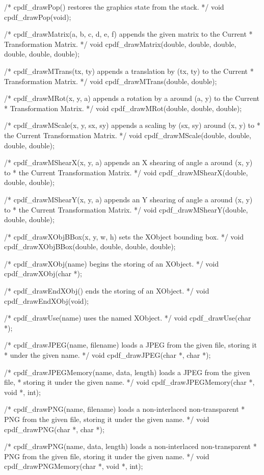 /* cpdf_drawPop() restores the graphics state from the stack. */
void cpdf_drawPop(void);

/* cpdf_drawMatrix(a, b, c, d, e, f) appends the given matrix to the Current
 * Transformation Matrix. */
void cpdf_drawMatrix(double, double, double, double, double, double);

/* cpdf_drawMTrans(tx, ty) appends a translation by (tx, ty) to the Current
 * Transformation Matrix. */
void cpdf_drawMTrans(double, double);

/* cpdf_drawMRot(x, y, a) appends a rotation by a around (a, y) to the Current
 * Transformation Matrix. */
void cpdf_drawMRot(double, double, double);

/* cpdf_drawMScale(x, y, sx, sy) appends a scaling by (sx, sy) around (x, y) to
 * the Current Transformation Matrix. */
void cpdf_drawMScale(double, double, double, double);

/* cpdf_drawMShearX(x, y, a) appends an X shearing of angle a around (x, y) to
 * the Current Transformation Matrix. */
void cpdf_drawMShearX(double, double, double);

/* cpdf_drawMShearY(x, y, a) appends an Y shearing of angle a around (x, y) to
 * the Current Transformation Matrix. */
void cpdf_drawMShearY(double, double, double);

/* cpdf_drawXObjBBox(x, y, w, h) sets the XObject bounding box. */
void cpdf_drawXObjBBox(double, double, double, double);

/* cpdf_drawXObj(name) begins the storing of an XObject. */
void cpdf_drawXObj(char *);

/* cpdf_drawEndXObj() ends the storing of an XObject. */
void cpdf_drawEndXObj(void);

/* cpdf_drawUse(name) uses the named XObject. */
void cpdf_drawUse(char *);

/* cpdf_drawJPEG(name, filename) loads a JPEG from the given file, storing it
 * under the given name. */
void cpdf_drawJPEG(char *, char *);

/* cpdf_drawJPEGMemory(name, data, length) loads a JPEG from the given file,
 * storing it under the given name. */
void cpdf_drawJPEGMemory(char *, void *, int);

/* cpdf_drawPNG(name, filename) loads a non-interlaced non-transparent
 * PNG from the given file, storing it under the given name. */
void cpdf_drawPNG(char *, char *);

/* cpdf_drawPNG(name, data, length) loads a non-interlaced non-transparent
 * PNG from the given file, storing it under the given name. */
void cpdf_drawPNGMemory(char *, void *, int);

